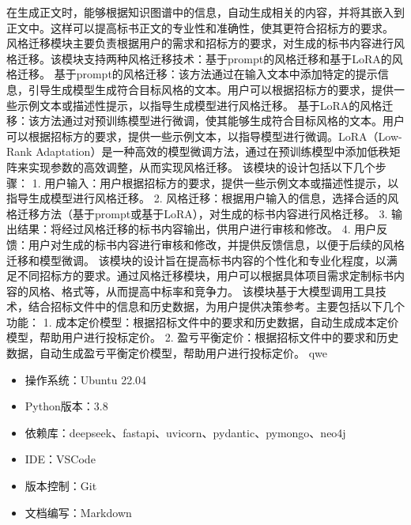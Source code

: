 \documentclass{xmu}
\begin{document}
在生成正文时，能够根据知识图谱中的信息，自动生成相关的内容，并将其嵌入到正文中。这样可以提高标书正文的专业性和准确性，使其更符合招标方的要求。
风格迁移模块主要负责根据用户的需求和招标方的要求，对生成的标书内容进行风格迁移。该模块支持两种风格迁移技术：基于prompt的风格迁移和基于LoRA的风格迁移。
基于prompt的风格迁移：该方法通过在输入文本中添加特定的提示信息，引导生成模型生成符合目标风格的文本。用户可以根据招标方的要求，提供一些示例文本或描述性提示，以指导生成模型进行风格迁移。
基于LoRA的风格迁移：该方法通过对预训练模型进行微调，使其能够生成符合目标风格的文本。用户可以根据招标方的要求，提供一些示例文本，以指导模型进行微调。LoRA（Low-Rank Adaptation）是一种高效的模型微调方法，通过在预训练模型中添加低秩矩阵来实现参数的高效调整，从而实现风格迁移。
该模块的设计包括以下几个步骤：
1. 用户输入：用户根据招标方的要求，提供一些示例文本或描述性提示，以指导生成模型进行风格迁移。
2. 风格迁移：根据用户输入的信息，选择合适的风格迁移方法（基于prompt或基于LoRA），对生成的标书内容进行风格迁移。
3. 输出结果：将经过风格迁移的标书内容输出，供用户进行审核和修改。
4. 用户反馈：用户对生成的标书内容进行审核和修改，并提供反馈信息，以便于后续的风格迁移和模型微调。
该模块的设计旨在提高标书内容的个性化和专业化程度，以满足不同招标方的要求。通过风格迁移模块，用户可以根据具体项目需求定制标书内容的风格、格式等，从而提高中标率和竞争力。
该模块基于大模型调用工具技术，结合招标文件中的信息和历史数据，为用户提供决策参考。主要包括以下几个功能：
1. 成本定价模型：根据招标文件中的要求和历史数据，自动生成成本定价模型，帮助用户进行投标定价。
2. 盈亏平衡定价：根据招标文件中的要求和历史数据，自动生成盈亏平衡定价模型，帮助用户进行投标定价。
qwe
        \begin{itemize}
            \item 操作系统：Ubuntu 22.04
            \item Python版本：3.8
            \item 依赖库：deepseek、fastapi、uvicorn、pydantic、pymongo、neo4j
        \end{itemize}
        \begin{itemize}
            \item IDE：VSCode
            \item 版本控制：Git
            \item 文档编写：Markdown
        \end{itemize}
\end{document}
